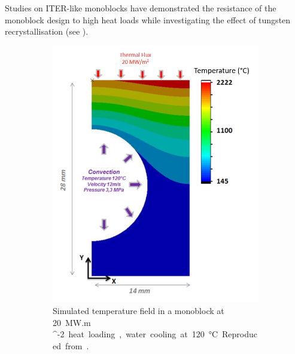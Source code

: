 Studies on ITER-like \glspl{monoblock} have demonstrated the resistance of the \gls{monoblock} design to high heat loads while investigating the effect of tungsten recrystallisation  (see ).

\begin{figure} [h]
    \centering
    \begin{subfigure}[t]{0.45\linewidth}
            \includegraphics[width=\linewidth]{Figures/Chapter1/alan_durif_monoblock.png}
            \caption{Simulated temperature field in a monoblock at \SI{20}{MW.m ^{-2}} heat loading, water cooling at \SI{120}{\celsius}. Reproduced from \cite{durif_modelisation_2019}.}
    \end{subfigure}\hfill%
    \begin{subfigure}[t]{0.45\linewidth}

\end{subfigure}
\end{figure}
